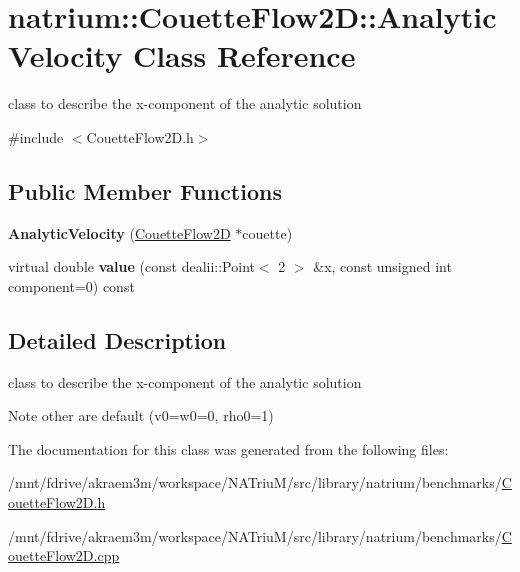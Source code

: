 \hypertarget{classnatrium_1_1CouetteFlow2D_1_1AnalyticVelocity}{
\section{natrium::CouetteFlow2D::AnalyticVelocity Class Reference}
\label{classnatrium_1_1CouetteFlow2D_1_1AnalyticVelocity}
}


class to describe the x-\/component of the analytic solution  


{\ttfamily \#include $<$CouetteFlow2D.h$>$}\subsection*{Public Member Functions}
\begin{DoxyCompactItemize}
\item 
\hypertarget{classnatrium_1_1CouetteFlow2D_1_1AnalyticVelocity_afea6c39b327d7e14b6ebd5b7e8bcd6b8}{
{\bfseries AnalyticVelocity} (\hyperlink{classnatrium_1_1CouetteFlow2D}{CouetteFlow2D} $\ast$couette)}
\label{classnatrium_1_1CouetteFlow2D_1_1AnalyticVelocity_afea6c39b327d7e14b6ebd5b7e8bcd6b8}

\item 
\hypertarget{classnatrium_1_1CouetteFlow2D_1_1AnalyticVelocity_a221bc963c37f2ed82f2a00231e957bfa}{
virtual double {\bfseries value} (const dealii::Point$<$ 2 $>$ \&x, const unsigned int component=0) const }
\label{classnatrium_1_1CouetteFlow2D_1_1AnalyticVelocity_a221bc963c37f2ed82f2a00231e957bfa}

\end{DoxyCompactItemize}


\subsection{Detailed Description}
class to describe the x-\/component of the analytic solution \begin{DoxyNote}{Note}
other are default (v0=w0=0, rho0=1) 
\end{DoxyNote}


The documentation for this class was generated from the following files:\begin{DoxyCompactItemize}
\item 
/mnt/fdrive/akraem3m/workspace/NATriuM/src/library/natrium/benchmarks/\hyperlink{CouetteFlow2D_8h}{CouetteFlow2D.h}\item 
/mnt/fdrive/akraem3m/workspace/NATriuM/src/library/natrium/benchmarks/\hyperlink{CouetteFlow2D_8cpp}{CouetteFlow2D.cpp}\end{DoxyCompactItemize}
